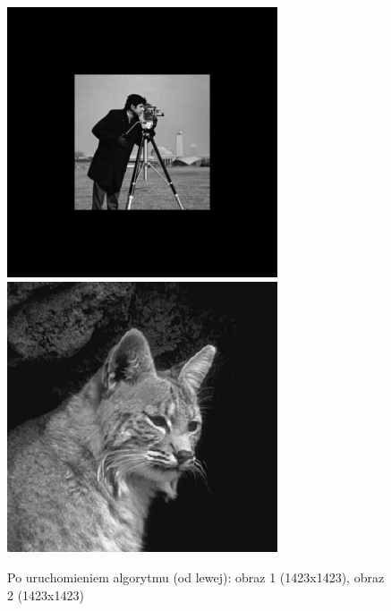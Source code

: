 \documentclass[a4paper,12pt]{book}
\begin{document}
\begin{figure}[H]
	\caption{Po uruchomieniem algorytmu (od lewej): obraz 1 (1423x1423), obraz 2 (1423x1423)}
	\includegraphics[width=8cm, height=8cm]{1-1/geometric-gray-photoman-cat.png}
	\includegraphics[width=8cm, height=8cm]{1-1/geometric-gray-cat-photoman.png}
\end{figure}
\end{document}
